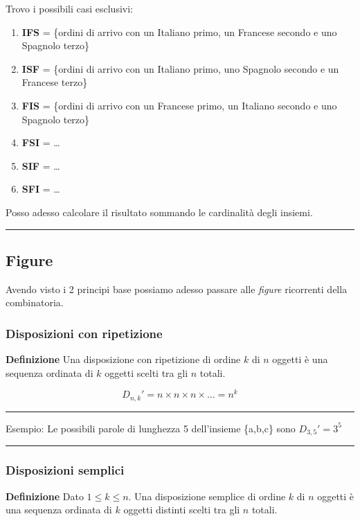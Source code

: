 \documentclass{article}
\begin{document}
Trovo i possibili casi esclusivi:
\begin{enumerate}
    \item \textbf{IFS} = \{ordini di arrivo con un Italiano primo, un Francese secondo e uno Spagnolo terzo\}
    \item \textbf{ISF} = \{ordini di arrivo con un Italiano primo, uno Spagnolo secondo e un Francese terzo\}
    \item \textbf{FIS} = \{ordini di arrivo con un Francese primo, un Italiano secondo e uno Spagnolo terzo\}
    \item \textbf{FSI} = \ldots
    \item \textbf{SIF} = \ldots
    \item \textbf{SFI} = \ldots
\end{enumerate}

Posso adesso calcolare il risultato sommando le cardinalità degli insiemi.

\noindent\rule{\textwidth}{0.5pt}

\subsection{Figure}

Avendo visto i 2 principi base possiamo adesso passare alle \textit{figure} ricorrenti della combinatoria.

\subsubsection{Disposizioni con ripetizione}

\textbf{Definizione} Una disposizione con ripetizione di ordine $k$ di $n$ oggetti è una sequenza ordinata di $k$ oggetti scelti tra gli $n$ totali.

$$D_{n,k}'=n\times n \times n \times \ldots = n^k$$

\vspace{4pt}

\noindent\rule{\textwidth}{0.5pt}

\noindent Esempio: Le possibili parole di lunghezza 5 dell'insieme \{a,b,c\} sono $D_{3,5}'=3^5$

\noindent\rule{\textwidth}{0.5pt}

\subsubsection{Disposizioni semplici}

\textbf{Definizione} Dato $1\leq k \leq n$. Una disposizione semplice di ordine $k$ di $n$ oggetti è una sequenza ordinata di $k$ oggetti distinti scelti tra gli $n$ totali.
\end{document}
